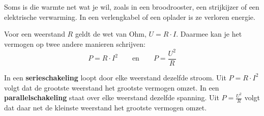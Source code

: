 \documentclass{ximera}
\begin{document}
Soms is die warmte net wat je wil, zoals in een broodrooster, een strijkijzer of een elektrische verwarming. In een verlengkabel of een oplader is ze verloren energie.

\begin{proposition}[title={Vermogen in een weerstand}]\nl
    Voor een weerstand $R$ geldt de wet van Ohm, $U = R \cdot I$. Daarmee kan je het vermogen op twee andere manieren schrijven:
    \begin{equation}\label{eq:joule}
        P = R \cdot I^{2} \qquad \text{en} \qquad P = \frac{U^{2}}{R}
    \end{equation}
\end{proposition}

\begin{remark}[foldable=true,title={Welke weerstand wordt het warmst?}]\nl
    In een \textbf{serieschakeling} loopt door elke weerstand dezelfde stroom. Uit $P = R \cdot I^{2}$ volgt dat de grootste weerstand het grootste vermogen omzet. In een \textbf{parallelschakeling} staat over elke weerstand dezelfde spanning. Uit $P = \frac{U^{2}}{R}$ volgt dat daar net de kleinste weerstand het grootste vermogen omzet.
\end{remark}
\end{document}
